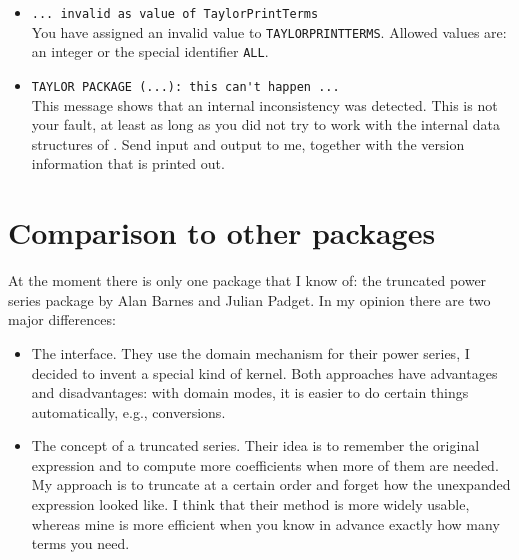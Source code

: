\begin{itemize}
\item \verb|... invalid as value of TaylorPrintTerms|\\
    You have assigned an invalid value to \verb|TAYLORPRINTTERMS|.
    Allowed values are: an integer or the special identifier
    \verb|ALL|.

\item \verb|TAYLOR PACKAGE (...): this can't happen ...|\\
    This message shows that an internal inconsistency was detected.
    This is not your fault, at least as long as you did not try to
    work with the internal data structures of \REDUCE. Send input
    and output to me, together with the version information that is
    printed out.

\end{itemize}

\section{Comparison to other packages}

At the moment there is only one \REDUCE{} package that I know of:
the truncated power series package by Alan Barnes and Julian Padget.
In my opinion there are two major differences:
\begin{itemize}
  \item The interface. They use the domain mechanism for their power
        series, I decided to invent a special kind of kernel. Both
        approaches have advantages and disadvantages: with domain
        modes, it is easier
        to do certain things automatically, e.g., conversions.
  \item The concept of a truncated series. Their idea is to remember
        the original expression and to compute more coefficients when
        more of them are needed. My approach is to truncate at a
        certain order and forget how the unexpanded expression
        looked like.  I think that their method is more widely
        usable, whereas mine is more efficient when you know in
        advance exactly how many terms you need.
\end{itemize}


